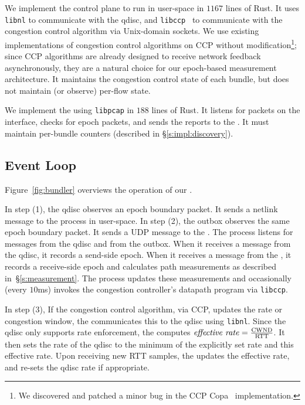 We implement the \inbox control plane to run in user-space in $1167$ lines of Rust. 
It uses \texttt{libnl} to communicate with the qdisc, and \texttt{libccp}~\cite{ccp} to communicate with the congestion control algorithm via Unix-domain sockets.
We use existing implementations of congestion control algorithms on CCP without modification\footnote{We discovered and patched a minor bug in the CCP Copa~\cite{copa} implementation.}; since CCP algorithms are already designed to receive network feedback asynchronously, they are a natural choice for our epoch-based measurement architecture.
It maintains the congestion control state of each bundle, but does not maintain (or observe) per-flow state.

We implement the \outbox using \texttt{libpcap} in $188$ lines of Rust. It listens for packets on the interface, checks for epoch packets, and sends the reports to the \inbox. It must maintain per-bundle counters (described in \S\ref{s:impl:discovery}).

\subsection{\name Event Loop}\label{s:impl:loop}
Figure~\ref{fig:bundler} overviews the operation of our \name. 

In step (1), the qdisc observes an epoch boundary packet. It sends a netlink message to the \inbox process in user-space.
In step (2), the outbox observes the same epoch boundary packet. It sends a UDP message to the \inbox.
The \inbox process listens for messages from the qdisc and from the outbox.
When it receives a message from the qdisc, it records a send-side epoch. When it receives a message from the \outbox, it records a receive-side epoch and calculates path measurements as described in~\S\ref{s:measurement}.
The \inbox process updates these measurements and occasionally (every $10$ms) invokes the congestion controller's datapath program via \texttt{libccp}.

In step (3), If the congestion control algorithm, via CCP, updates the rate or congestion window, the \inbox communicates this to the qdisc using \texttt{libnl}.
Since the qdisc only supports rate enforcement, the \inbox computes $\text{\emph{effective rate}} = \frac{\text{CWND}}{\text{RTT}}$.
It then sets the rate of the qdisc to the minimum of the explicitly set rate and this effective rate.
Upon receiving new RTT samples, the \inbox updates the effective rate, and re-sets the qdisc rate if appropriate.

